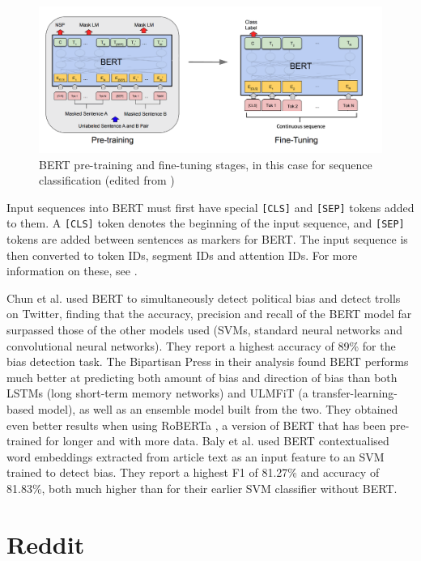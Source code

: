 \begin{figure}
    \centering
    \includegraphics[scale=0.37]{0-img/bert-pretraining-finetuning.png}
    \caption{BERT pre-training and fine-tuning stages, in this case for sequence classification (edited from \cite{bert})}
    \label{fig:bert-pretraining-finetuning}
\end{figure}

Input sequences into BERT must first have special \texttt{[CLS]} and \texttt{[SEP]} tokens added to them. A \texttt{[CLS]} token denotes the beginning of the input sequence, and \texttt{[SEP]} tokens are added between sentences as markers for BERT. The input sequence is then converted to token IDs, segment IDs and attention IDs. For more information on these, see \cite{bert}.

Chun et al. \cite{chun} used BERT to simultaneously detect political bias and detect trolls on Twitter, finding that the accuracy, precision and recall of the BERT model far surpassed those of the other models used (SVMs, standard neural networks and convolutional neural networks). They report a highest accuracy of 89\% for the bias detection task. The Bipartisan Press in their analysis \cite{bipartisan-press} found BERT performs much better at predicting both amount of bias and direction of bias than both LSTMs (long short-term memory networks) and ULMFiT (a transfer-learning-based model), as well as an ensemble model built from the two. They obtained even better results when using RoBERTa \cite{roberta}, a version of BERT that has been pre-trained for longer and with more data. Baly et al. \cite{baly-acl2020} used BERT contextualised word embeddings extracted from article text as an input feature to an SVM trained to detect bias. They report a highest F1 of 81.27\% and accuracy of 81.83\%, both much higher than for their earlier SVM classifier without BERT.

\section{Reddit} \label{sec:reddit}

